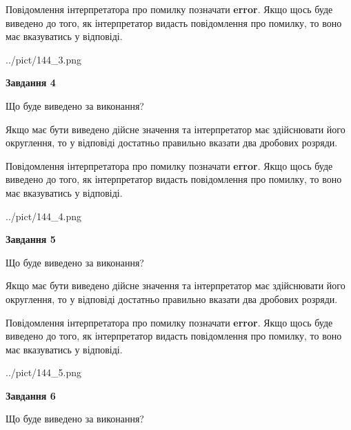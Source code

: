\documentclass[12pt, ukrainian]{article}
\begin{document}
{\begin {Large}
Повідомлення інтерпретатора про помилку позначати \textbf{error}.
Якщо щось буде виведено до того, як інтерпретатор видасть повідомлення про помилку, 
то воно має вказуватись у відповіді. \par

\begin{center}
	{../pict/144_3.png}
\end{center}
\newpage

{\begin {center}\textbf{Завдання 4}\end {center}}\par
Що буде виведено за виконання? \par

Якщо має бути виведено дійсне значення та інтерпретатор має здійснювати його округлення, 
то у відповіді достатньо правильно вказати два дробових розряди.

Повідомлення інтерпретатора про помилку позначати \textbf{error}.
Якщо щось буде виведено до того, як інтерпретатор видасть повідомлення про помилку, 
то воно має вказуватись у відповіді. \par

\begin{center}
	{../pict/144_4.png}
\end{center}
\newpage

{\begin {center}\textbf{Завдання 5}\end {center}}\par
Що буде виведено за виконання? \par

Якщо має бути виведено дійсне значення та інтерпретатор має здійснювати його округлення, 
то у відповіді достатньо правильно вказати два дробових розряди.

Повідомлення інтерпретатора про помилку позначати \textbf{error}.
Якщо щось буде виведено до того, як інтерпретатор видасть повідомлення про помилку, 
то воно має вказуватись у відповіді. \par

\begin{center}
	{../pict/144_5.png}
\end{center}
\newpage

{\begin {center}\textbf{Завдання 6}\end {center}}\par
Що буде виведено за виконання? \par


\end{Large}}
\end{document}
